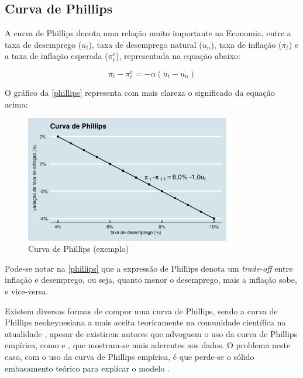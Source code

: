\documentclass[
	10pt,				%
	openright,			%
	twoside,			%
	a5paper,			%
	english,			%
	french,				%
	spanish,			%
	brazil				%
	]{abntex2}
\begin{document}
\subsection{Curva de Phillips}\label{curva-de-phillips}

A curva de Phillips denota uma relação muito importante na Economia,
entre a taxa de desemprego (\(u_t\)), taxa de desemprego natural
(\(u_n\)), taxa de inflação (\(\pi_t\)) e a taxa de inflação esperada
(\(\pi_t^e\)), representada na equação abaixo:

\[\pi_t - \pi_t^e = -\alpha (u_t - u_n)\]

O gráfico da \autoref{phillips} representa com mais clareza o
significado da equação acima:

\begin{figure}[htbp]
\caption{Curva de Phillips (exemplo)}\label{phillips}
\begin{center}
\includegraphics[width=0.80000\textwidth]{imagens/phillips.png}
\end{center}
\end{figure}

Pode-se notar na \autoref{phillips} que a expressão de Phillips denota
um \emph{trade-off} entre inflação e desemprego, ou seja, quanto menor o
desemprego, mais a inflação sobe, e vice-versa.

Existem diversas formas de compor uma curva de Phillips, sendo a curva
de Phillips neokeynesiana a mais aceita teoricamente na comunidade
científica na atualidade \cite[p.~10]{mankiw2000}, apesar de existirem
autores que advoguem o uso da curva de Phillips empírica, como
 e ,
que mostram-se mais aderentes aos dados. O problema neste caso, com o
uso da curva de Phillips empírica, é que perde-se o sólido embasamento
teórico para explicar o modelo \cite[p.~20]{mankiw2000}.
\end{document}
